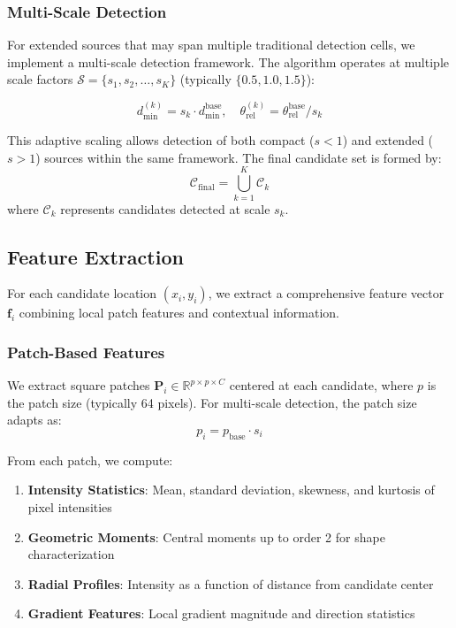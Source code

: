 \documentclass[twocolumn,10pt]{aastex631}
\begin{document}
\subsubsection{Multi-Scale Detection}
For extended sources that may span multiple traditional detection cells, we implement a multi-scale detection framework. The algorithm operates at multiple scale factors $\mathcal{S} = \{s_1, s_2, \ldots, s_K\}$ (typically $\{0.5, 1.0, 1.5\}$):

\begin{equation}
d_{\min}^{(k)} = s_k \cdot d_{\min}^{\text{base}}, \quad \theta_{\text{rel}}^{(k)} = \theta_{\text{rel}}^{\text{base}} / s_k
\end{equation}

This adaptive scaling allows detection of both compact ($s < 1$) and extended ($s > 1$) sources within the same framework. The final candidate set is formed by:
\begin{equation}
\mathcal{C}_{\text{final}} = \bigcup_{k=1}^{K} \mathcal{C}_k
\end{equation}
where $\mathcal{C}_k$ represents candidates detected at scale $s_k$.

\subsection{Feature Extraction}

For each candidate location $(x_i, y_i)$, we extract a comprehensive feature vector $\mathbf{f}_i$ combining local patch features and contextual information.

\subsubsection{Patch-Based Features}
We extract square patches $\mathbf{P}_i \in \mathbb{R}^{p \times p \times C}$ centered at each candidate, where $p$ is the patch size (typically 64 pixels). For multi-scale detection, the patch size adapts as:
\begin{equation}
p_i = p_{\text{base}} \cdot s_i
\end{equation}

From each patch, we compute:

\begin{enumerate}
\item \textbf{Intensity Statistics}: Mean, standard deviation, skewness, and kurtosis of pixel intensities
\item \textbf{Geometric Moments}: Central moments up to order 2 for shape characterization
\item \textbf{Radial Profiles}: Intensity as a function of distance from candidate center
\item \textbf{Gradient Features}: Local gradient magnitude and direction statistics
\end{enumerate}
\end{document}
